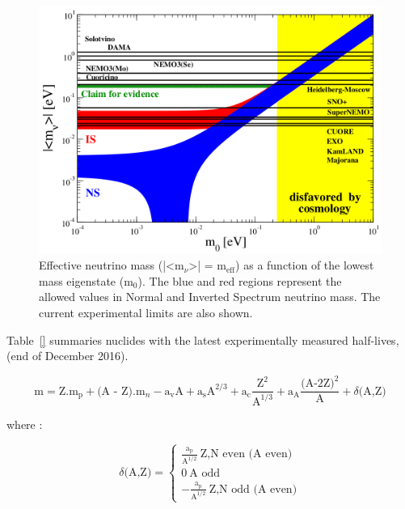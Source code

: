 \documentclass[main.tex]{subfiles}
\begin{document}
\begin{figure}[h!]
\begin{center}
\includegraphics[scale=0.30]{pictures/Chap2/m_eff_neutrino.png}
\caption{Effective neutrino mass (|<m$_{\nu}$>| = m$_{\text{eff}}$) as a function of the lowest mass eigenstate (m$_\text{0}$). The blue and red regions represent the allowed values in Normal and Inverted Spectrum neutrino mass. The current experimental limits are also shown.}
\label{mEff}
\end{center}
\end{figure}



\NI Table~\ref{} summaries nuclides with the latest experimentally measured half-lives, (end of December 2016). 
 
 
 
 
 

\begin{equation}
\text{m} = \text{Z}.\text{m}_\text{p} + \text{(A - Z)}.\text{m}_{n} - \text{a}_\text{v} \text{A} + \text{a}_\text{s} \text{A}^{\text{2/3}} +  \text{a}_\text{c} \frac{\text{Z}^\text{2}}{\text{A}^{\text{1/3}}} +  \text{a}_\text{A} \frac{\text{(A-2Z)}^\text{2}}{\text{A}} + \delta \text{(A,Z)} 
\end{equation}

\NI where :


\begin{equation}
\delta \text{(A,Z)} = 
\left\{
\begin{array}{l}
  \frac{\text{a}_\text{p}}{\text{A}^{\text{1/2}}}~\text{Z,N~even~(A even)} \\[0.5cm]
  \text{0}~\text{A~odd}\\[0.5cm]
  -\frac{\text{a}_\text{p}}{\text{A}^{\text{1/2}}}~\text{Z,N~odd~(A even)} 
\end{array}
\right.
\end{equation} 
\end{document}
